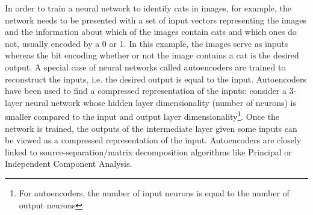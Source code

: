  In order to train a neural network to identify cats in images, for example, the network needs to be presented with a set of input vectors representing the images and the information about which of the images contain cats and which ones do not, usually encoded by a 0 or 1. In this example, the images serve as inputs whereas the bit encoding whether or not the image contains a cat is the desired output. A special case of neural networks called autoencoders are trained to reconstruct the inputs, i.e. the desired output is equal to the input. Autoencoders have been used to find a compressed representation of the inputs: consider a 3-layer neural network whose hidden layer dimensionality (number of neurons) is smaller compared to the input and output layer dimensionality\footnote{For autoencoders, the number of input neurons is equal to the number of output neurons}. Once the network is trained, the outputs of the intermediate layer given some inputs can be viewed as a compressed representation of the input. Autoencoders are closely linked to source-separation/matrix decomposition algorithms like Principal or Independent Component Analysis.

